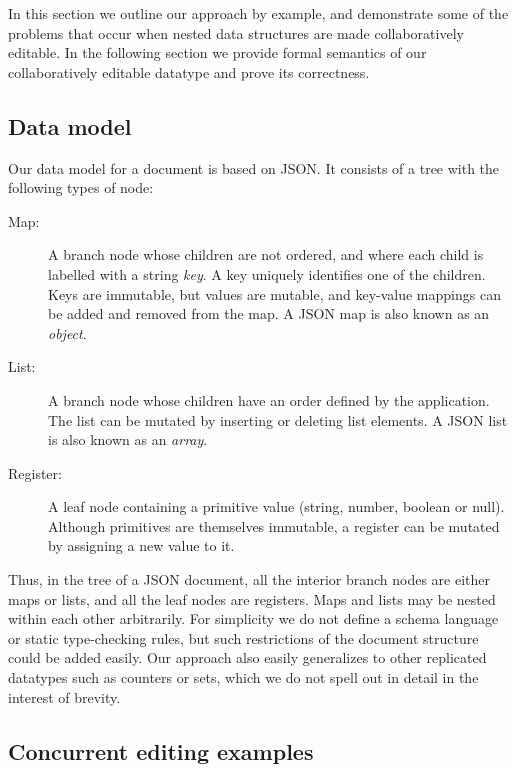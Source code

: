 \documentclass[10pt,journal,compsoc]{IEEEtran}
\begin{document}
In this section we outline our approach by example, and demonstrate some of the problems that occur when nested data structures are made collaboratively editable. In the following section we provide formal semantics of our collaboratively editable datatype and prove its correctness.

\subsection{Data model}

Our data model for a document is based on JSON. It consists of a tree with the following types of node:

\begin{description}
\item[Map:] A branch node whose children are not ordered, and where each child is labelled with a string \emph{key}. A key uniquely identifies one of the children. Keys are immutable, but values are mutable, and key-value mappings can be added and removed from the map. A JSON map is also known as an \emph{object}.
\item[List:] A branch node whose children have an order defined by the application. The list can be mutated by inserting or deleting list elements. A JSON list is also known as an \emph{array}.
\item[Register:] A leaf node containing a primitive value (string, number, boolean or null). Although primitives are themselves immutable, a register can be mutated by assigning a new value to it.
\end{description}

Thus, in the tree of a JSON document, all the interior branch nodes are either maps or lists, and all the leaf nodes are registers. Maps and lists may be nested within each other arbitrarily. For simplicity we do not define a schema language or static type-checking rules, but such restrictions of the document structure could be added easily. Our approach also easily generalizes to other replicated datatypes such as counters or sets, which we do not spell out in detail in the interest of brevity.

\subsection{Concurrent editing examples}
\end{document}
